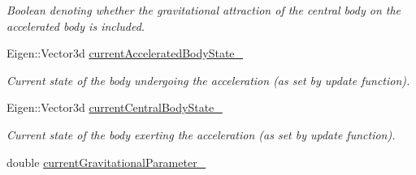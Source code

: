 \begin{DoxyCompactItemize}
\begin{DoxyCompactList}\small\item\em Boolean denoting whether the gravitational attraction of the central body on the accelerated body is included. \end{DoxyCompactList}\item 
Eigen\+::\+Vector3d \hyperlink{classtudat_1_1acceleration__partials_1_1CentralGravitationPartial_a23e4ef647cb009fb289451b8ed60aef3}{current\+Accelerated\+Body\+State\+\_\+}\hypertarget{classtudat_1_1acceleration__partials_1_1CentralGravitationPartial_a23e4ef647cb009fb289451b8ed60aef3}{}\label{classtudat_1_1acceleration__partials_1_1CentralGravitationPartial_a23e4ef647cb009fb289451b8ed60aef3}

\begin{DoxyCompactList}\small\item\em Current state of the body undergoing the acceleration (as set by update function). \end{DoxyCompactList}\item 
Eigen\+::\+Vector3d \hyperlink{classtudat_1_1acceleration__partials_1_1CentralGravitationPartial_a1e5f686d5f5b4801b23a2a688987f81d}{current\+Central\+Body\+State\+\_\+}\hypertarget{classtudat_1_1acceleration__partials_1_1CentralGravitationPartial_a1e5f686d5f5b4801b23a2a688987f81d}{}\label{classtudat_1_1acceleration__partials_1_1CentralGravitationPartial_a1e5f686d5f5b4801b23a2a688987f81d}

\begin{DoxyCompactList}\small\item\em Current state of the body exerting the acceleration (as set by update function). \end{DoxyCompactList}\item 
double \hyperlink{classtudat_1_1acceleration__partials_1_1CentralGravitationPartial_a3fbdd798345e32af1c7d4287bd0baa46}{current\+Gravitational\+Parameter\+\_\+}\hypertarget{classtudat_1_1acceleration__partials_1_1CentralGravitationPartial_a3fbdd798345e32af1c7d4287bd0baa46}{}\label{classtudat_1_1acceleration__partials_1_1CentralGravitationPartial_a3fbdd798345e32af1c7d4287bd0baa46}


\end{DoxyCompactItemize}
